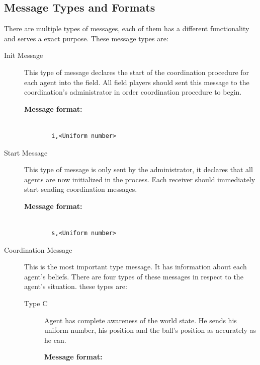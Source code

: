 \subsection{Message Types and Formats}
There are multiple types of messages, each of them has a different functionality and serves a exact purpose. These message types are:
\begin{description}
\item[Init Message] This type of message declares the start of the coordination procedure for each agent into the field. All field players should sent this message to the coordination's administrator in order coordination procedure to begin.

\begin{description}
  \item[{\bf Message format:}]
  \begin{verbatim}
  
  i,<Uniform number>
  \end{verbatim}
\end{description}

\item[Start Message] This type of message is only sent by the administrator, it declares that all agents are now initialized in the process. Each receiver should immediately start sending coordination messages.

\begin{description}
  \item[{\bf Message format:}]
  \begin{verbatim}
  
  s,<Uniform number>
  \end{verbatim}
\end{description}

\item[Coordination Message] This is the most important type message. It has information about each agent's beliefs. There are four types of these messages in respect to the agent's situation. these types are:
\begin{description}

\item[Type C] Agent has complete awareness of the world state. He sends his uniform number, his position and the ball's position as accurately as he can.

\begin{description}
  \item[{\bf Message format:}]
  \begin{verbatim}
  

\end{verbatim}
\end{description}
\end{description}
\end{description}

